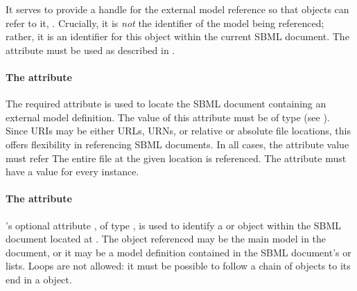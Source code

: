   It serves to provide a handle for the external model reference so that \Submodel objects can refer to it, .  Crucially, it is \emph{not} the identifier of the model being referenced; rather, it is an identifier for this \ExternalModelDefinition object within the current SBML document.  The  attribute must be used as described in .


\paragraph{The \fixttspace{} attribute}

The required attribute  is used to locate the SBML document containing an external model definition.  The value of this attribute must be of type  (see ). Since URIs may be either URLs, URNs, or relative or absolute file locations, this offers flexibility in referencing SBML documents.  In all cases, the  attribute value must refer   The entire file at the given location is referenced.  The  attribute must have a value for every \ExternalModelDefinition instance.

\paragraph{The \fixttspace{} attribute}

\ExternalModelDefinition's optional attribute , of type , is used to identify a \Model or \ExternalModelDefinition object within the SBML document located at .  The object referenced may be the main model in the document, or it may be a model definition contained in the SBML document's  or  lists.  Loops are not allowed: it must be possible to follow a chain of \ExternalModelDefinition objects to its end in a \Model object.

